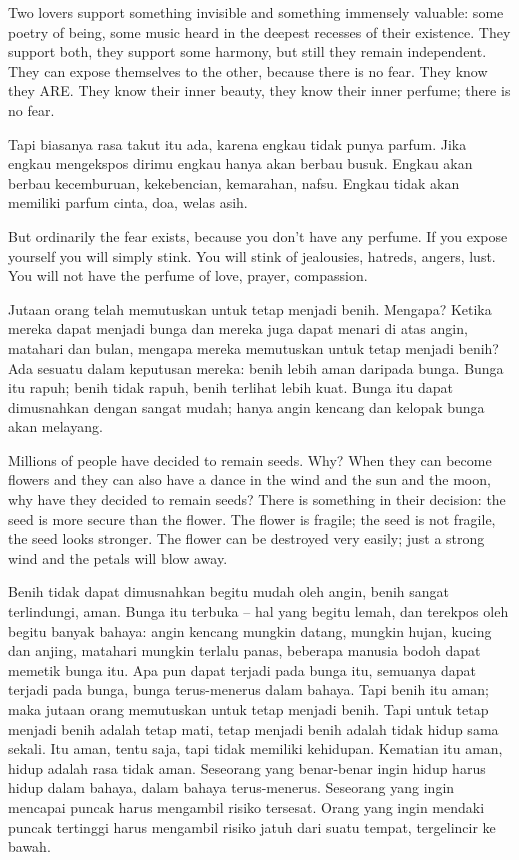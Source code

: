\english
Two lovers support something invisible and something immensely valuable: some poetry of being, some music heard in the deepest recesses of their existence. They support both, they support some harmony, but still they remain independent. They can expose themselves to the other, because there is no fear. They know they ARE. They know their inner beauty, they know their inner perfume; there is no fear.

\bahasa
Tapi biasanya rasa takut itu ada, karena engkau tidak punya parfum. Jika engkau mengekspos dirimu engkau hanya akan berbau busuk. Engkau akan berbau kecemburuan, kekebencian, kemarahan, nafsu. Engkau tidak akan memiliki parfum cinta, doa, welas asih.

\english
But ordinarily the fear exists, because you don't have any perfume. If you expose yourself you will simply stink. You will stink of jealousies, hatreds, angers, lust. You will not have the perfume of love, prayer, compassion.

\bahasa
Jutaan orang telah memutuskan untuk tetap menjadi benih. Mengapa? Ketika mereka dapat menjadi bunga dan mereka juga dapat menari di atas angin, matahari dan bulan, mengapa mereka memutuskan untuk tetap menjadi benih? Ada sesuatu dalam keputusan mereka: benih lebih aman daripada bunga. Bunga itu rapuh; benih tidak rapuh, benih terlihat lebih kuat. Bunga itu dapat dimusnahkan dengan sangat mudah; hanya angin kencang dan kelopak bunga akan melayang.

\english
Millions of people have decided to remain seeds. Why? When they can become flowers and they can also have a dance in the wind and the sun and the moon, why have they decided to remain seeds? There is something in their decision: the seed is more secure than the flower. The flower is fragile; the seed is not fragile, the seed looks stronger. The flower can be destroyed very easily; just a strong wind and the petals will blow away.

\bahasa
Benih tidak dapat dimusnahkan begitu mudah oleh angin, benih sangat terlindungi, aman. Bunga itu terbuka -- hal yang begitu lemah, dan terekpos oleh begitu banyak bahaya: angin kencang mungkin datang, mungkin hujan, kucing dan anjing, matahari mungkin terlalu panas, beberapa manusia bodoh dapat memetik bunga itu. Apa pun dapat terjadi pada bunga itu, semuanya dapat terjadi pada bunga, bunga terus-menerus dalam bahaya. Tapi benih itu aman; maka jutaan orang memutuskan untuk tetap menjadi benih. Tapi untuk tetap menjadi benih adalah tetap mati, tetap menjadi benih adalah tidak hidup sama sekali. Itu aman, tentu saja, tapi tidak memiliki kehidupan. Kematian itu aman, hidup adalah rasa tidak aman. Seseorang yang benar-benar ingin hidup harus hidup dalam bahaya, dalam bahaya terus-menerus. Seseorang yang ingin mencapai puncak harus mengambil risiko tersesat. Orang yang ingin mendaki puncak tertinggi harus mengambil risiko jatuh dari suatu tempat, tergelincir ke bawah.

